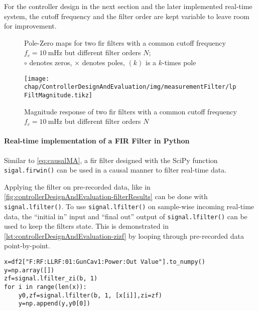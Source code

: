 For the controller design in the next section and the later implemented real-time system, the cutoff frequency and the filter order are kept variable to leave room for improvement.

\begin{figure}[tb]
    \centering
        \subfloat[$N=10$]{}
        \qquad
        \subfloat[$N=40$]{}
       \caption[FIR pole zero maps]{Pole-Zero maps for two \gls{fir} filters with a common cutoff frequency $f_c=\SI{10}{\milli\hertz}$ but different filter orders $N$;\\ $\circ$ denotes zeros, $\times$ denotes poles, $(k)$ is a $k$-times pole}
    \label{fig:controllerDesignAndEvaluation-zplane}
\end{figure}

\begin{figure}[tb]
	\centering
	\texttt{[image: chap/ControllerDesignAndEvaluation/img/measurementFilter/lpFiltMagnitude.tikz]}
	\caption[FIR magnitude response]{Magnitude response of two \gls{fir} filters with a common cutoff frequency $f_c=\SI{10}{\milli\hertz}$ but different filter orders $N$}
	\label{fig:controllerDesignAndEvaluation-magn}
\end{figure}

\FloatBarrier
\paragraph{Real-time implementation of a FIR Filter in Python}
Similar to \autoref{eq:causalMA}, a \gls{fir} filter designed with the SciPy function \texttt{sigal.firwin()} can be used in a causal manner to filter real-time data.

Applying the filter on pre-recorded data, like in \autoref{fig:controllerDesignAndEvaluation-filterResults} can be done with \texttt{signal.lfilter()}. To use \texttt{signal.lfilter()} on sample-wise incoming real-time data, the ``initial in'' input and ``final out'' output of \texttt{signal.lfilter()} can be used to keep the filters state. This is demonstrated in \autoref{lst:controllerDesignAndEvaluation-zizf} by looping through pre-recorded data point-by-point.

\begin{lstlisting}[style=python,caption = Demonstration of the \texttt{zi} and \texttt{zf} variables when using \texttt{signal.lfilter()}, label = lst:controllerDesignAndEvaluation-zizf]
x=df2["F:RF:LLRF:01:GunCav1:Power:Out Value"].to_numpy()
y=np.array([])
zf=signal.lfilter_zi(b, 1)
for i in range(len(x)):
    y0,zf=signal.lfilter(b, 1, [x[i]],zi=zf)
    y=np.append(y,y0[0])
\end{lstlisting}












